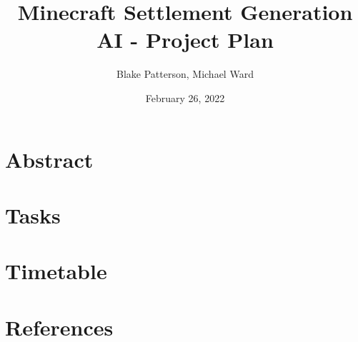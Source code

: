 \documentclass[11pt, oneside]{article}
\begin{document}
\title{Minecraft Settlement Generation AI - Project Plan}
\author{Blake Patterson, Michael Ward}
\date{February 26, 2022}
\maketitle

\newpage
\tableofcontents
\newpage
{}


\section{Abstract}
\label{abstract}

\newpage


\section{Tasks}
\label{tasks}

\newpage


\section{Timetable}
\label{timetable}

\newpage


\section{References}
\label{references}
\end{document}
